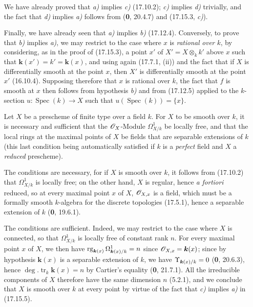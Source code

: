 We have already proved that \emph{a)} implies \emph{c)} (17.10.2); \emph{c)} implies \emph{d)} trivially, and the fact that \emph{d)} implies \emph{a)} follows from (\textbf{0}, 20.4.7) and (17.15.3, \emph{c)}).

Finally, we have already seen that \emph{a)} implies \emph{b)} (17.12.4). Conversely, to prove that \emph{b)} implies \emph{a)}, we may restrict to the case where $x$ is \emph{rational over $k$}, by considering, as in the proof of (17.15.3), a point $x'$ of $X'=X\otimes_k k'$ above $x$ such that $\boldsymbol{k}(x')=k'=\boldsymbol{k}(x)$, and using again (17.7.1, (ii)) and the fact that if $X$ is differentially smooth at the point $x$, then $X'$ is differentially smooth at the point $x'$ (16.10.4). Supposing therefore that $x$ is rational over $k$, the fact that $f$ is smooth at $x$ then follows from hypothesis \emph{b)} and from (17.12.5) applied to the $k$-section $u:\operatorname{Spec}(k)\to X$ such that $u(\operatorname{Spec}(k))=\{x\}$.

\begin{corollary}[17.15.6]
\label{IV.17.15.6}
Let $X$ be a prescheme of finite type over a field $k$. For $X$ to be smooth over $k$, it is necessary and sufficient that the $\mathscr{O}_X$-Module $\varOmega^1_{X/k}$ be locally free, and that the local rings at the maximal points of $X$ be fields that are separable extensions of $k$ \textup{(this last condition being automatically satisfied if $k$ is a \emph{perfect} field and $X$ a \emph{reduced} prescheme)}.
\end{corollary}

The conditions are necessary, for if $X$ is smooth over $k$, it follows from (17.10.2) that $\varOmega^1_{X/k}$ is locally free; on the other hand, $X$ is regular, hence \emph{a fortiori} reduced, so at every maximal point $x$ of $X$, $\mathscr{O}_{X,x}$ is a field, which must be a formally smooth $k$-algebra for the discrete topologies (17.5.1), hence a separable extension of $k$ (\textbf{0}, 19.6.1).

The conditions are sufficient. Indeed, we may restrict to the case where $X$ is connected, so that $\varOmega^1_{X/k}$ is locally free of constant rank $n$. For every maximal point $x$ of $X$, we then have $\operatorname{rg}_{\boldsymbol{k}(x)}\Omega^1_{\boldsymbol{k}(x)/k}=n$ since $\mathscr{O}_{X,x}=\boldsymbol{k}(x)$; since by hypothesis $\boldsymbol{k}(x)$ is a separable extension of $k$, we have $\Upsilon_{\boldsymbol{k}(x)/k}=0$ (\textbf{0}, 20.6.3), hence $\deg.\operatorname{tr}_k \boldsymbol{k}(x)=n$ by Cartier's equality (\textbf{0}, 21.7.1). All the irreducible components of $X$ therefore have the same dimension $n$ (5.2.1), and we conclude that $X$ is smooth over $k$ at every point by virtue of the fact that \emph{c)} implies \emph{a)} in (17.15.5).

